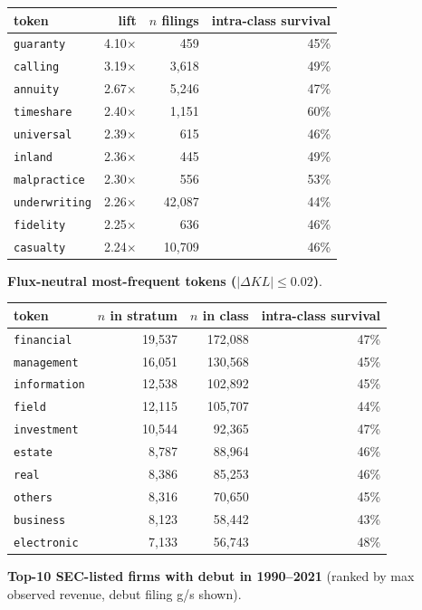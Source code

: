 \begin{tabular}{lrrr}
\toprule
token & lift & $n$ filings & intra-class survival \\
\midrule
\texttt{guaranty} & 4.10$\times$ & 459 & 45\% \\
\texttt{calling} & 3.19$\times$ & 3,618 & 49\% \\
\texttt{annuity} & 2.67$\times$ & 5,246 & 47\% \\
\texttt{timeshare} & 2.40$\times$ & 1,151 & 60\% \\
\texttt{universal} & 2.39$\times$ & 615 & 46\% \\
\texttt{inland} & 2.36$\times$ & 445 & 49\% \\
\texttt{malpractice} & 2.30$\times$ & 556 & 53\% \\
\texttt{underwriting} & 2.26$\times$ & 42,087 & 44\% \\
\texttt{fidelity} & 2.25$\times$ & 636 & 46\% \\
\texttt{casualty} & 2.24$\times$ & 10,709 & 46\% \\
\bottomrule
\end{tabular}

\textbf{Flux-neutral most-frequent tokens ($|\Delta KL|\leq 0.02$)}.

\begin{tabular}{lrrr}
\toprule
token & $n$ in stratum & $n$ in class & intra-class survival \\
\midrule
\texttt{financial} & 19,537 & 172,088 & 47\% \\
\texttt{management} & 16,051 & 130,568 & 45\% \\
\texttt{information} & 12,538 & 102,892 & 45\% \\
\texttt{field} & 12,115 & 105,707 & 44\% \\
\texttt{investment} & 10,544 & 92,365 & 47\% \\
\texttt{estate} & 8,787 & 88,964 & 46\% \\
\texttt{real} & 8,386 & 85,253 & 46\% \\
\texttt{others} & 8,316 & 70,650 & 45\% \\
\texttt{business} & 8,123 & 58,442 & 43\% \\
\texttt{electronic} & 7,133 & 56,743 & 48\% \\
\bottomrule
\end{tabular}

\textbf{Top-10 SEC-listed firms with debut in 1990--2021} (ranked by max observed revenue, debut filing g/s shown).

